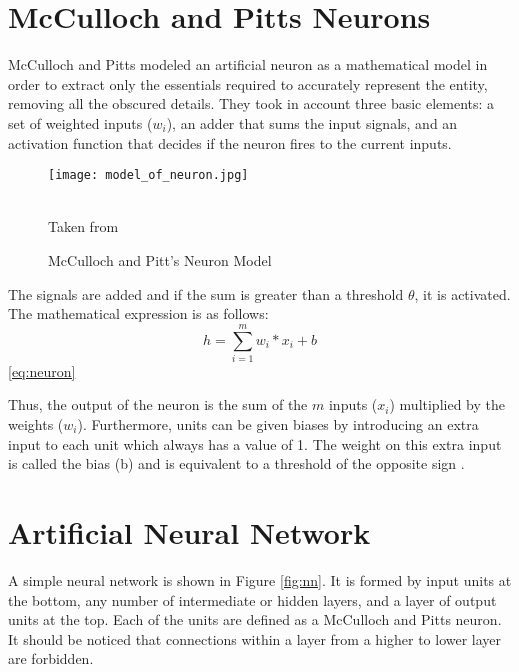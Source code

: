 \section{McCulloch and Pitts Neurons}
McCulloch and Pitts modeled an artificial neuron as a mathematical model in order to extract only the essentials required to accurately represent the entity, removing all the obscured details. They took in account three basic elements: a set of weighted inputs ($w_i$), an adder that sums the input signals, and an activation function that decides if the neuron fires to the current inputs.
\begin{figure}[h]
\centering
 
\texttt{[image: model\_of\_neuron.jpg]}
\caption{McCulloch and Pitt's Neuron Model}
\label{fig:neuron}
\begin{minipage}{12cm}
    \footnotesize
    \center
    \emph \\ Taken from \cite{marsland2015machine}\\
    \end{minipage}
\end{figure}

The signals are added and if the sum is greater than a threshold $\theta$, it is activated. The mathematical expression is as follows:\\
\begin{equation} \label{eq:neuron}
h=\sum_{i=1}^{m} w_i * x_i + b
\end{equation}\ref{eq:neuron}

Thus, the output of the neuron is the sum of the $m$ inputs ($x_i$) multiplied by the weights ($w_i$). Furthermore, units can be given biases by introducing an extra input to each unit which always has a value of 1. The weight on this extra input is called the bias (b) and is equivalent to a threshold of the opposite sign \cite{polk2002cognitive}. 


\section{Artificial Neural Network}

A simple neural network is shown in Figure \ref{fig:nn}. It is formed by input units at the bottom, any number of intermediate or hidden layers, and a layer of output units at the top. Each of the units are  defined as a McCulloch and Pitts neuron. It should be noticed that connections within a layer from a higher to lower layer are forbidden. 

